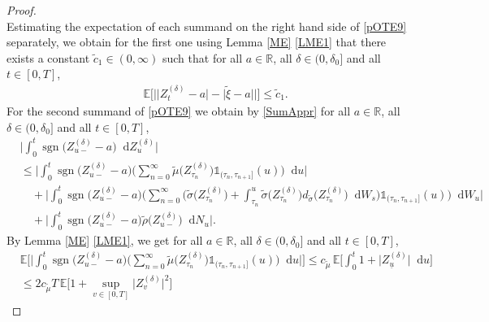 \documentclass[11pt,a4paper]{article}
\numberwithin{equation}{section}
\theoremstyle{definition}
\newcommand{\E}{{\mathbb{E}}}
\newcommand{\R}{{\mathbb{R}}}
\newcommand{\diff}{\mathop{}\!\mathrm{d}}
\begin{document}
\begin{proof}
\begin{equation}
\end{equation}
Estimating the expectation of each summand on the right hand side of \eqref{pOTE9} separately, we obtain for the first one using Lemma \ref{ME} \eqref{LME1} that there exists a constant $\widetilde c_1\in(0,\infty)$ such that for all $a\in\R$, all $\delta \in(0,\delta_0]$ and all $t\in[0,T]$,
\begin{equation}\label{pOTE10}
    \begin{aligned}
    &\E\Big[\Big|\big| Z^{(\delta)}_t - a\big| - \big| \widetilde\xi -a\big|\Big|\Big]
    \leq \widetilde c_1.
    \end{aligned}
\end{equation}
For the second summand of \eqref{pOTE9} we obtain by \eqref{SumAppr} for all $a\in\R$, all $\delta \in(0,\delta_0]$ and all $t\in[0,T]$,
\begin{equation}\label{pOTE12}
    \begin{aligned}
    &\Big|\int_0^t \operatorname{sgn}\big(Z^{(\delta)}_{u-} -a\big) \diff Z^{(\delta)}_{u}\Big|\\
    &\leq \Big|\int_0^t \operatorname{sgn}\big(Z^{(\delta)}_{u-} -a\big)\Big(\sum_{n=0}^{\infty} \widetilde \mu \big(Z^{(\delta)}_{\tau_n}\big)\mathds{1}_{(\tau_n,\tau_{n+1}]}(u)\Big) \diff u\Big|\\
    &\quad+\Big|\int_0^t \operatorname{sgn}\big(Z^{(\delta)}_{u-} -a\big)\Big(\sum_{n=0}^{\infty} \Big( \widetilde\sigma \big(Z^{(\delta)}_{\tau_n}\big)+ \int_{\tau_n}^u \widetilde\sigma \big(Z^{(\delta)}_{\tau_n}\big)d_{\widetilde\sigma} \big(Z^{(\delta)}_{\tau_n}\big)\diff W_s \Big)\mathds{1}_{(\tau_n,\tau_{n+1}]}(u)\Big) \diff W_u\Big|\\
    &\quad+\Big|\int_0^t \operatorname{sgn}\big(Z^{(\delta)}_{u-} -a\big)\widetilde\rho\big(Z^{(\delta)}_{u-}\big) \diff N_u\Big|.
    \end{aligned}
\end{equation}
By Lemma \ref{ME} \eqref{LME1}, we get for all $a\in\R$, all $\delta \in(0,\delta_0]$ and all $t\in[0,T]$,
\begin{equation}\label{pOTE13}
    \begin{aligned}
    &\E\Big[\Big|\int_0^t \operatorname{sgn}\big(Z^{(\delta)}_{u-} -a\big)\Big(\sum_{n=0}^{\infty} \widetilde \mu \big(Z^{(\delta)}_{\tau_n}\big)\mathds{1}_{(\tau_n,\tau_{n+1}]}(u)\Big) \diff u\Big|\Big]
    \leq c_{\widetilde\mu}\, \E\Big[\int_0^t 1+ \big|Z^{(\delta)}_{\underline u}\big|\diff u\Big]\\
    &\leq 2 c_{\widetilde\mu} T \,\E\Big[1+ \sup_{v\in[0,T]}\big|Z^{(\delta)}_{v}\big|^2\Big] 

\end{aligned}
\end{equation}
\end{proof}
\end{document}
